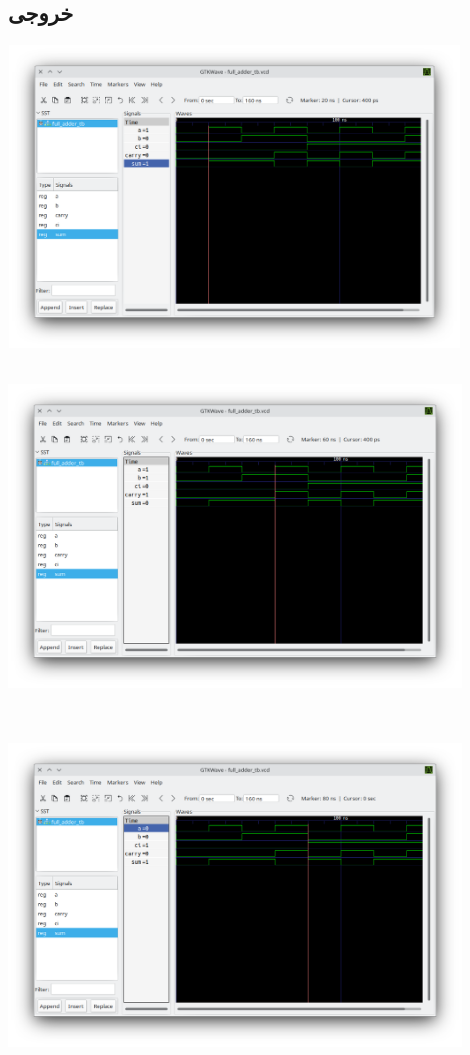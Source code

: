 \documentclass[dvipsnames, svgnames, x11names, a4paper, 11pt, oneside]{book}
\begin{document}
					\subsection{خروجی }
						\begin{center}
							\includegraphics[width=12cm, height=8cm]{./images/full_adder_vcd_2}	
						\end{center}
						\begin{center}
							\includegraphics[width=12cm, height=9cm]{./images/full_adder_vcd_3}	
						\end{center}
						\begin{center}
							\includegraphics[width=12cm, height=9cm]{./images/full_adder_vcd_4}	
						\end{center}
				\clearpage
\end{document}
